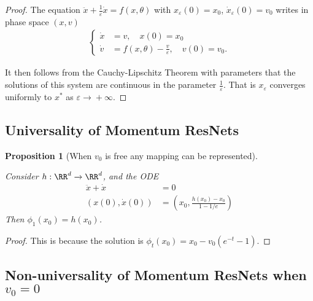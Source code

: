 \documentclass{article}
\newtheorem{proposition}{Proposition}
\begin{document}
\begin{proof}
The equation $\ddot{x} + \frac{1}{\varepsilon} \dot{x} = f(x,\theta)$ with $x_{\varepsilon}(0)=x_0$, $\dot{x}_{\varepsilon}(0) = v_0$ writes in phase space $(x,v)$
\begin{equation*}
\begin{split}
\begin{cases}
\dot{x} &= v, \quad x(0) = x_0 \\
\dot{v} &= f(x,\theta) - \frac{v}{\varepsilon}, \quad v(0) = v_0.
\end{cases}
\end{split}
\end{equation*}

It then follows from the Cauchy-Lipschitz Theorem with parameters \citep[Theorem 2, Chapter 2]{perko2013differential} that the solutions of this system are continuous in the parameter $\frac1\varepsilon$. That is $x_{\varepsilon}$ converges uniformly to $x^*$ as $\varepsilon \xrightarrow{} + \infty$.

\end{proof}

\subsection{Universality of Momentum ResNets}\label{app:learn_init}

\begin{proposition}[When $v_0$ is free any mapping can be represented]\label{learn_init_speed}

 Consider $h : \RR^d \xrightarrow{} \RR^d$, and the ODE
 \begin{equation*}
     \begin{split}
        \ddot{x} + \dot{x} &= 0\\
        (x(0),\dot{x}(0)) &=(x_0,\frac{h(x_0) - x_0}{1- 1/e})
    \end{split}
 \end{equation*}
 Then $\phi_1(x_0) = h(x_0)$.
\end{proposition}

\begin{proof}
This is because the solution is $\phi_t(x_0) = x_0 - v_0(e^{-t} - 1)$. 
\end{proof}


\subsection{Non-universality of Momentum ResNets when $v_0=0$}
\end{document}

